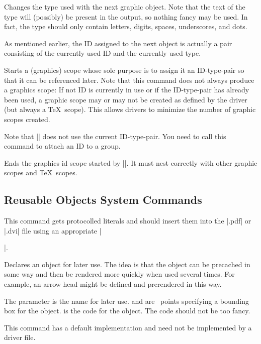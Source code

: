 \begin{command}{\pgfsys@use@type{}}
  Changes the type used with the next graphic object. Note that the
  text of the type will (possibly) be present in the output, so
  nothing fancy may be used. In fact, the type should only contain
  letters, digits, spaces, underscores, and dots.

  As mentioned earlier, the ID assigned to the next object is actually
  a pair consisting of the currently used ID and the currently used
  type. 
\end{command}


\begin{command}{\pgfsys@begin@idscope}
  Starts a (graphics) scope whose sole purpose is to assign it an
  ID-type-pair so that it can be referenced later. Note that this
  command does not always produce a graphics scope: If not ID is
  currently in use or if the ID-type-pair has already been used,
  a graphic scope may or may not be created as defined by the driver
  (but always a \TeX\ scope). This allows drivers to minimize the
  number of graphic scopes created.

  Note that |\pgfsys@beginscope| does not use the current
  ID-type-pair. You need to call this command to attach an ID to a
  group. 
\end{command}

\begin{command}{\pgfsys@end@idscope}
  Ends the graphics id scope started by |\pgfsys@end@idscope|. It must
  nest correctly with other graphic scopes and \TeX\ scopes.
\end{command}

\subsection{Reusable Objects System Commands}

\begin{command}{\pgfsys@invoke{}}
  This command gets protocolled literals and should insert them into
  the |.pdf| or |.dvi| file using an appropriate |\special|.
\end{command}

\begin{command}{\pgfsys@defobject{}}
  Declares an object for later use. The idea is that the object can be
  precached in some way and then be rendered more quickly when used
  several times. For example, an arrow head might be defined and
  prerendered in this way.

  The parameter  is the name for later use.  and  are \pgfname\ points specifying a bounding
  box for the object.  is the code for the object. The code
  should not be too fancy.

  This command has a default implementation and need not be
  implemented by a driver file.
\end{command}

